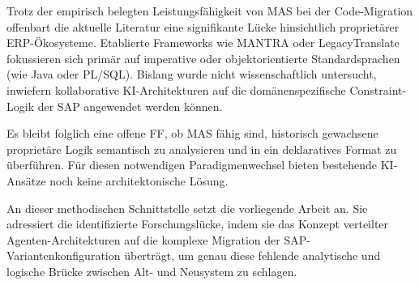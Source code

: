 Trotz der empirisch belegten Leistungsfähigkeit von \ac{MAS} bei der Code-Migration offenbart die aktuelle Literatur eine signifikante Lücke hinsichtlich proprietärer ERP-Ökosysteme. Etablierte Frameworks wie MANTRA oder LegacyTranslate fokussieren sich primär auf imperative oder objektorientierte Standardsprachen (wie Java oder PL/SQL). Bislang wurde nicht wissenschaftlich untersucht, inwiefern kollaborative \ac{KI}-Architekturen auf die domänenspezifische Constraint-Logik der SAP angewendet werden können.  

Es bleibt folglich eine offene \ac{FF}, ob \ac{MAS} fähig sind, historisch gewachsene proprietäre Logik semantisch zu analysieren und in ein deklaratives Format zu überführen. Für diesen notwendigen Paradigmenwechsel bieten bestehende \ac{KI}-Ansätze noch keine architektonische Lösung.  

An dieser methodischen Schnittstelle setzt die vorliegende Arbeit an. Sie adressiert die identifizierte Forschungslücke, indem sie das Konzept verteilter Agenten-Architekturen auf die komplexe Migration der SAP-Variantenkonfiguration überträgt, um genau diese fehlende analytische und logische Brücke zwischen Alt- und Neusystem zu schlagen.